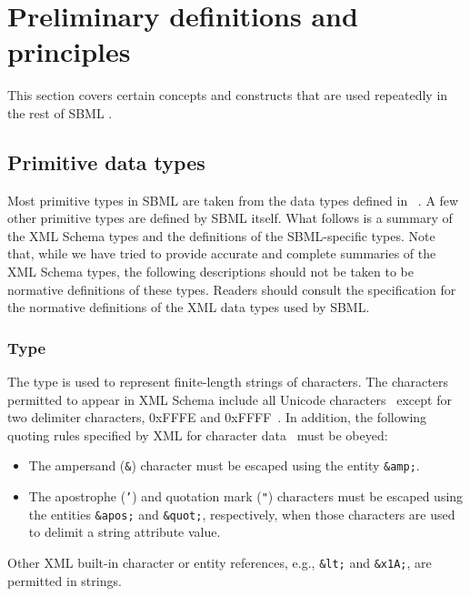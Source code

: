 
\section{Preliminary definitions and principles}
\label{sec:general}

This section covers certain concepts and constructs that are used
repeatedly in the rest of SBML \thisL.


\subsection{Primitive data types}
\label{sec:primitive-types}

Most primitive types in SBML are taken from the data types defined
in \xmlschemaone~\citep{biron:2000,fallside:2000,thompson:2000}.
A few other primitive types are defined by SBML itself.  What
follows is a summary of the XML Schema types and the definitions
of the SBML-specific types.  Note that, while we have tried to
provide accurate and complete summaries of the XML Schema types,
the following descriptions should not be taken to be normative
definitions of these types.  Readers should consult the
\xmlschemaone specification for the normative definitions of the
XML data types used by SBML.


\subsubsection{Type }
\label{sec:string}

The \xmlschemaone type  is used to represent
finite-length strings of characters.  The characters permitted to
appear in XML Schema  include all Unicode
characters~\citep{unicode:1996} except for two delimiter
characters, 0xFFFE and 0xFFFF~\citep{biron:2000}.  In addition,
the following quoting rules specified by XML for character
data~\citep{bray:2004} must be obeyed:
\begin{itemize}

\item The ampersand (\texttt{\&}) character must be escaped using
  the entity \texttt{\&amp;}.

\item The apostrophe (\texttt{'}) and quotation mark (\texttt{"})
  characters must be escaped using the entities \texttt{\&apos;}
  and \texttt{\&quot;}, respectively, when those characters are
  used to delimit a string attribute value.

\end{itemize}
Other XML built-in character or entity references, e.g.,
\texttt{\&lt;} and \texttt{\&x1A;}, are permitted in strings.



